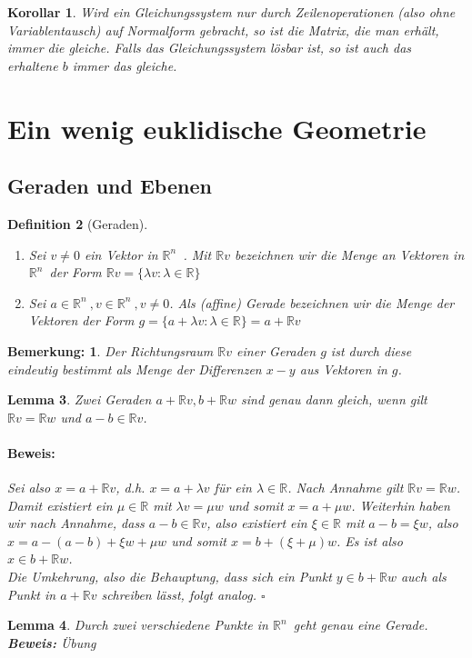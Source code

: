 \documentclass{report}
\newcommand{\IN}[1]{\index{#1|BH}}
\newcommand{\lb}{\lambda}
\newcommand{\R}{\mathbb{R}}
\newcommand{\Rn}{\mathbb{R}^n\ }
\newcommand{\mRn}{$\mathbb{R}^n$\ }
\theoremstyle{customrem}
\newtheorem*{bem}{Bemerkung:}
\theoremstyle{customdef}
\newtheorem{definition}{Definition}[chapter]
\newtheorem{lemma}[definition]{Lemma}
\newtheorem{korrolar}[definition]{Korollar}
\renewenvironment{proof}{\vspace{-.75cm}\paragraph{Beweis: }}{\vspace{-.5cm}\hfill$\square$}
\begin{document}
	\vspace{.2cm}
	\begin{korrolar}
		Wird ein Gleichungssystem \textit{nur} durch Zeilenoperationen (also ohne Variablentausch) auf Normalform gebracht, so ist die Matrix, die man erhält, immer die gleiche. Falls das Gleichungssystem lösbar ist, so ist auch das erhaltene $b$ immer das gleiche.
	\end{korrolar}

\section{Ein wenig euklidische Geometrie}

\subsection{Geraden und Ebenen}

	\begin{definition}[Geraden]
		\IN{Gerade}
		$ $\vspace{-.5cm}
		\begin{enumerate}
			\item Sei $v \not= 0$ ein Vektor in \mRn. Mit $\R v$ bezeichnen wir die Menge an Vektoren in \mRn der Form $\R v = \{\lb v : \lb \in \R\}$
			\item Sei $a \in \Rn, v \in \Rn, v \neq 0$. Als (affine) Gerade bezeichnen wir die Menge der Vektoren der Form $g = \{a + \lb v : \lb \in \R\} = a + \R v$
		\end{enumerate}
	\end{definition}
	
	\begin{bem}
		Der Richtungsraum $\R v$ einer Geraden $g$ ist durch diese eindeutig bestimmt als Menge der Differenzen $x - y$ aus Vektoren in $g$.
	\end{bem}
	
	\begin{lemma}
		\IN{Gerade!Gleichheit}
		Zwei Geraden $a + \R v, b + \R w$ sind genau dann gleich, wenn gilt $\R v = \R w$ und $a - b \in \R v$.\\
		\begin{proof}
			Sei also  $x = a + \R v$, d.h. $x = a + \lb v$ für ein $\lb \in \R$. Nach Annahme gilt $\R v = \R w$. Damit existiert ein $\mu \in \R$ mit $\lb v = \mu w$ und somit $x = a + \mu w$. Weiterhin haben wir nach Annahme, dass $a-b \in \R v$, also existiert ein $\xi \in \R$ mit $a - b = \xi w$, also $x = a - (a - b) + \xi w + \mu w$ und somit $x = b + (\xi + \mu) w$.
			Es ist also $x \in b + \R w$.\\
			Die Umkehrung, also die Behauptung, dass sich ein Punkt $y \in b + \R w$ auch als Punkt in $a + \R v$ schreiben lässt, folgt analog.
		\end{proof}
	\end{lemma}
	\vspace{.2cm}
	\begin{lemma}
		Durch zwei verschiedene Punkte in \mRn geht genau eine Gerade.\\
		\textbf{Beweis: } Übung
	\end{lemma}
\end{document}
